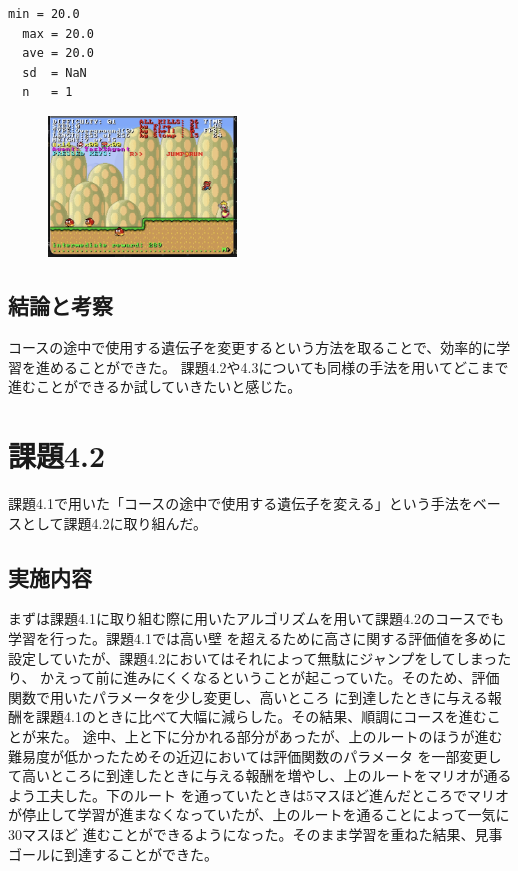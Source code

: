 \documentclass[a4paper,11pt]{jsarticle}
\begin{document}
{\begin{lstlisting}[caption=実行結果]
  min = 20.0
  max = 20.0
  ave = 20.0
  sd  = NaN
  n   = 1
\end{lstlisting}

\begin{figure}
  \begin{center}
    \includegraphics*[width=50mm]{images/report3/reaching-goal.png}
  \end{center}
\end{figure}

\subsection*{結論と考察}
コースの途中で使用する遺伝子を変更するという方法を取ることで、効率的に学習を進めることができた。
課題4.2や4.3についても同様の手法を用いてどこまで進むことができるか試していきたいと感じた。

\section*{課題4.2}

課題4.1で用いた「コースの途中で使用する遺伝子を変える」という手法をベースとして課題4.2に取り組んだ。

\subsection*{実施内容}

まずは課題4.1に取り組む際に用いたアルゴリズムを用いて課題4.2のコースでも学習を行った。課題4.1では高い壁
を超えるために高さに関する評価値を多めに設定していたが、課題4.2においてはそれによって無駄にジャンプをしてしまったり、
かえって前に進みにくくなるということが起こっていた。そのため、評価関数で用いたパラメータを少し変更し、高いところ
に到達したときに与える報酬を課題4.1のときに比べて大幅に減らした。その結果、順調にコースを進むことが来た。
途中、上と下に分かれる部分があったが、上のルートのほうが進む難易度が低かったためその近辺においては評価関数のパラメータ
を一部変更して高いところに到達したときに与える報酬を増やし、上のルートをマリオが通るよう工夫した。下のルート
を通っていたときは5マスほど進んだところでマリオが停止して学習が進まなくなっていたが、上のルートを通ることによって一気に30マスほど
進むことができるようになった。そのまま学習を重ねた結果、見事ゴールに到達することができた。

}
\end{document}
